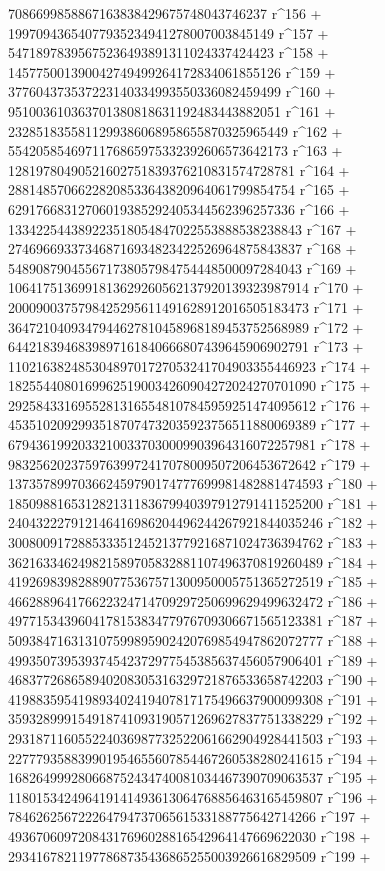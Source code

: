        7086699858867163838429675748043746237 r^156 + 
       19970943654077935234941278007003845149 r^157 + 
       54718978395675236493891311024337424423 r^158 + 
       145775001390042749499264172834061855126 r^159 + 
       377604373537223140334993550336082459499 r^160 + 
       951003610363701380818631192483443882051 r^161 + 
       2328518355811299386068958655870325965449 r^162 + 
       5542058546971176865975332392606573642173 r^163 + 
       12819780490521602751839376210831574728781 r^164 + 
       28814857066228208533643820964061799854754 r^165 + 
       62917668312706019385292405344562396257336 r^166 + 
       133422544389223518054847022553888538238843 r^167 + 
       274696693373468716934823422526964875843837 r^168 + 
       548908790455671738057984754448500097284043 r^169 + 
       1064175136991813629260562137920139323987914 r^170 + 
       2000900375798425295611491628912016505183473 r^171 + 
       3647210409347944627810458968189453752568989 r^172 + 
       6442183946839897161840666807439645906902791 r^173 + 
       11021638248530489701727053241704903355446923 r^174 + 
       18255440801699625190034260904272024270701090 r^175 + 
       29258433169552813165548107845959251474095612 r^176 + 
       45351020929935187074732035923756511880069389 r^177 + 
       67943619920332100337030009903964316072257981 r^178 + 
       98325620237597639972417078009507206453672642 r^179 + 
       137357899703662459790174777699981482881474593 r^180 + 
       185098816531282131183679940397912791411525200 r^181 + 
       240432227912146416986204496244267921844035246 r^182 + 
       300800917288533351245213779216871024736394762 r^183 + 
       362163346249821589705832881107496370819260489 r^184 + 
       419269839828890775367571300950005751365272519 r^185 + 
       466288964176622324714709297250699629499632472 r^186 + 
       497715343960417815383477976709306671565123381 r^187 + 
       509384716313107599895902420769854947862072777 r^188 + 
       499350739539374542372977545385637456057906401 r^189 + 
       468377268658940208305316329721876533658742203 r^190 + 
       419883595419893402419407817175496637900099308 r^191 + 
       359328999154918741093190571269627837751338229 r^192 + 
       293187116055224036987732522061662904928441503 r^193 + 
       227779358839901954655607854467260538280241615 r^194 + 
       168264999280668752434740081034467390709063537 r^195 + 
       118015342496419141493613064768856463165459807 r^196 + 
       78462625672226479473706561533188775642714266 r^197 + 
       49367060972084317696028816542964147669622030 r^198 + 
       29341678211977868735436865255003926616829509 r^199 + 

